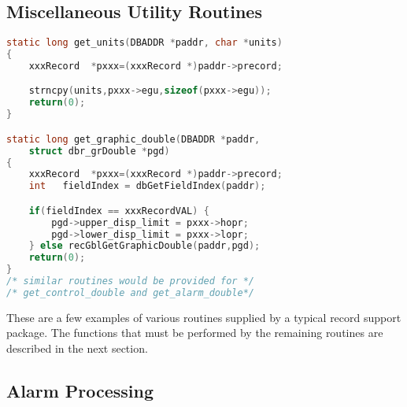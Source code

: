 \subsection{Miscellaneous Utility Routines}

\begin{lstlisting}[language=C]
static long get_units(DBADDR *paddr, char *units)
{
    xxxRecord  *pxxx=(xxxRecord *)paddr->precord;

    strncpy(units,pxxx->egu,sizeof(pxxx->egu));
    return(0);
}

static long get_graphic_double(DBADDR *paddr,
    struct dbr_grDouble *pgd)
{
    xxxRecord  *pxxx=(xxxRecord *)paddr->precord;
    int   fieldIndex = dbGetFieldIndex(paddr);

    if(fieldIndex == xxxRecordVAL) {
        pgd->upper_disp_limit = pxxx->hopr;
        pgd->lower_disp_limit = pxxx->lopr;
    } else recGblGetGraphicDouble(paddr,pgd);
    return(0);
}
/* similar routines would be provided for */
/* get_control_double and get_alarm_double*/
\end{lstlisting}

These are a few examples of various routines supplied by a typical record support package.
The functions that must be performed by the remaining routines are described in the next section.

\subsection{Alarm Processing}

